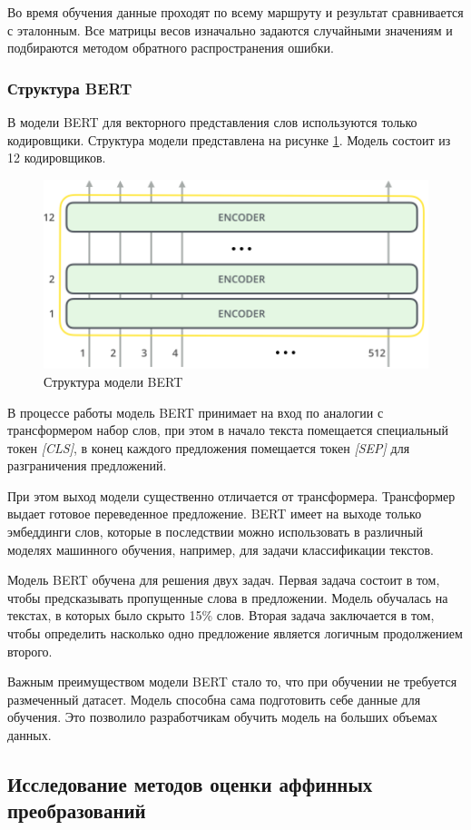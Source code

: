 \documentclass[a4paper,14pt]{article}
\begin{document}
Во время обучения данные проходят по всему маршруту и результат сравнивается с эталонным.
Все матрицы весов изначально задаются случайными значениям и подбираются методом обратного распространения ошибки.

\subsubsection{Структура BERT}

В модели BERT для векторного представления слов используются только кодировщики.
Структура модели представлена на рисунке \ref{fig:bertstructure}.
Модель состоит из 12 кодировщиков.

\begin{figure}[H]
	\centering
	\includegraphics[width=0.5\linewidth]{image/bert_structure}
	\caption{Структура модели BERT}
	\label{fig:bertstructure}
\end{figure}

В процессе работы модель BERT принимает на вход по аналогии с трансформером набор слов, при этом в начало текста помещается специальный токен \textit{[CLS]}, в конец каждого предложения помещается токен \textit{[SEP]} для разграничения предложений.

При этом выход модели существенно отличается от трансформера.
Трансформер выдает готовое переведенное предложение.
BERT имеет на выходе только эмбеддинги слов, которые в последствии можно использовать в различный моделях машинного обучения, например, для задачи классификации текстов.

Модель BERT обучена для решения двух задач.
Первая задача состоит в том, чтобы предсказывать пропущенные слова в предложении.
Модель обучалась на текстах, в которых было скрыто 15\% слов.
Вторая задача заключается в том, чтобы определить насколько одно предложение является логичным продолжением второго.

Важным преимуществом модели BERT стало то, что при обучении не требуется размеченный датасет.
Модель способна сама подготовить себе данные для обучения.
Это позволило разработчикам обучить модель на больших объемах данных.

\subsection{Исследование методов оценки аффинных преобразований}
\end{document}
